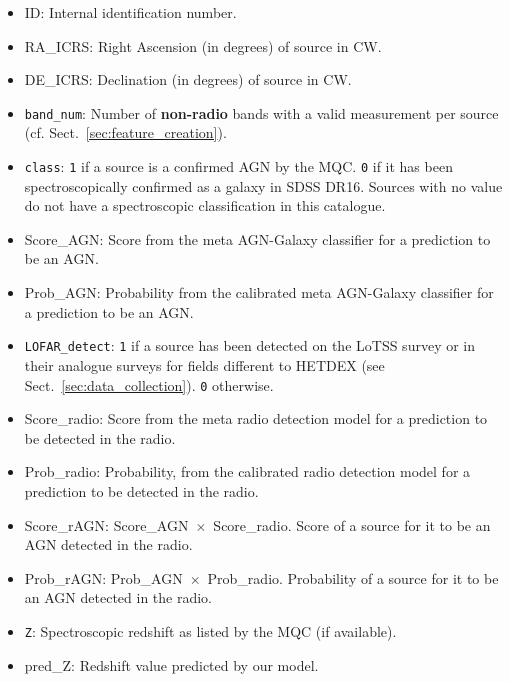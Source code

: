 \documentclass{aa}
\begin{document}
\begin{appendix}
\begin{itemize}
\item ID: Internal identification number.
\item RA\_ICRS: Right Ascension (in degrees) of source in CW.
\item DE\_ICRS: Declination (in degrees) of source in CW.
\item \texttt{band\_num}: Number of \textbf{non-radio} bands with a valid measurement per source (cf. Sect.~\ref{sec:feature_creation}).
\item \texttt{class}: \verb|1| if a source is a confirmed AGN by the MQC. \verb|0| if it has been spectroscopically confirmed as a galaxy in SDSS DR16. Sources with no value do not have a spectroscopic classification in this catalogue.
\item Score\_AGN: Score from the meta AGN-Galaxy classifier for a prediction to be an AGN.
\item Prob\_AGN: Probability from the calibrated meta AGN-Galaxy classifier for a prediction to be an AGN.
\item \texttt{LOFAR\_detect}: \verb|1| if a source has been detected on the LoTSS survey or in their analogue surveys for fields different to HETDEX (see Sect.~\ref{sec:data_collection}). \verb|0| otherwise.
\item Score\_radio: Score from the meta radio detection model for a prediction to be detected in the radio.
\item Prob\_radio: Probability, from the calibrated radio detection model for a prediction to be detected in the radio.
\item Score\_rAGN: Score\_AGN~$\times$~Score\_radio. Score of a source for it to be an AGN detected in the radio.
\item Prob\_rAGN: Prob\_AGN~$\times$~Prob\_radio. Probability of a source for it to be an AGN detected in the radio.
\item \texttt{Z}: Spectroscopic redshift as listed by the MQC (if available).
\item pred\_Z: Redshift value predicted by our model.

\end{itemize}

\end{appendix}
\end{document}

